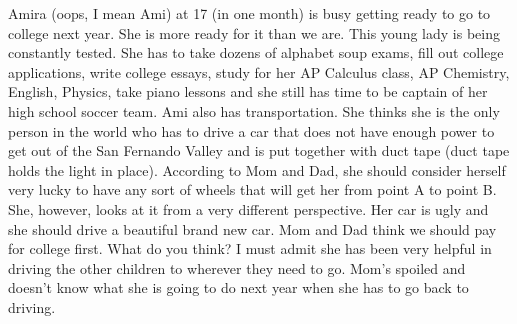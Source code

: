 Amira (oops, I mean Ami) at 17 (in one month) is busy getting ready to go to college next year. She is more ready for it than we are. This young
lady is being constantly tested. She has to take dozens of alphabet soup exams, fill out college applications, write college essays, study for
her AP Calculus class, AP Chemistry, English, Physics, take piano lessons and she still has time to be captain of her high school soccer team.
Ami also has transportation. She thinks she is the only person in the world who has to drive a car that does not have enough power to get out of
the San Fernando Valley and is put together with duct tape (duct tape holds the light in place). According to Mom and Dad, she should consider
herself very lucky to have any sort of wheels that will get her from point A to point B. She, however, looks at it from a very different
perspective. Her car is ugly and she should drive a beautiful brand new car. Mom and Dad think we should pay for college first. What do you
think? I must admit she has been very helpful in driving the other children to wherever they need to go. Mom's spoiled and doesn't know what she
is going to do next year when she has to go back to driving.

